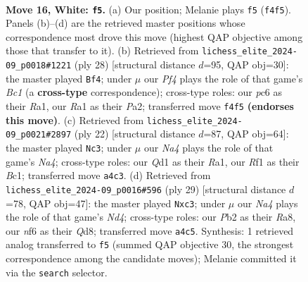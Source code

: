 \documentclass[11pt]{article}
\begin{document}
\begin{figure}[p]
\label{fig:thought-m28}
\end{figure}

\clearpage

\begin{figure}[p]\centering
\begin{subfigure}{0.46\textwidth}\centering
\resizebox{\linewidth}{!}{%
\newchessgame
\chessboard[
  setfen={r6r/p2nkppp/q1pbpn2/8/Np1P1PPN/4P3/PP5P/R1BQ1RK1 w - - 0 16},
  showmover=false,
  pgfstyle=straightmove, color=movearrow, markmove={f4-f5}
]}
\caption{}
\end{subfigure}\hfill
\begin{subfigure}{0.46\textwidth}\centering
\resizebox{\linewidth}{!}{%
\newchessgame
\chessboard[
  setfen={r4rk1/p1q1bppp/b1p2n2/2p2P2/1pN1P3/3P4/PPP1N1PP/R1BQ1RK1 w - - 6 15},
  showmover=false,
  pgfstyle=straightmove, color=movearrow, markmove={c1-f4}
]}
\caption{}
\end{subfigure}
\\[4pt]
\begin{subfigure}{0.46\textwidth}\centering
\resizebox{\linewidth}{!}{%
\newchessgame
\chessboard[
  setfen={rn3rk1/pp2ppbp/2pp1np1/8/N1qPP3/5BPP/PP3P2/R1BQ1RK1 w - - 0 12},
  showmover=false,
  pgfstyle=straightmove, color=movearrow, markmove={a4-c3}
]}
\caption{}
\end{subfigure}\hfill
\begin{subfigure}{0.46\textwidth}\centering
\resizebox{\linewidth}{!}{%
\newchessgame
\chessboard[
  setfen={r2q1r1k/1pp3pp/p1n1b3/2Pnpp2/8/PQNP1NP1/4PPBP/2R2RK1 b - - 2 15},
  showmover=false,
  pgfstyle=straightmove, color=movearrow, markmove={d5-c3}
]}
\caption{}
\end{subfigure}
\caption{\textbf{Move 16, White: \texttt{f5}.} (a) Our position; Melanie plays \texttt{f5} (\texttt{f4f5}). Panels (b)--(d) are the retrieved master positions whose correspondence most drove this move (highest QAP objective among those that transfer to it). (b) Retrieved from \texttt{lichess\_elite\_2024-09\_p0018\#1221} (ply 28) [structural distance $d$=95, QAP obj=30]: the master played \texttt{Bf4}; under $\mu$ our \emph{Pf4} plays the role of that game's \emph{Bc1} (a \textbf{cross-type} correspondence); cross-type roles: our \emph{p}c6 as their \emph{R}a1, our \emph{R}a1 as their \emph{P}a2; transferred move \texttt{f4f5} \textbf{(endorses this move)}. (c) Retrieved from \texttt{lichess\_elite\_2024-09\_p0021\#2897} (ply 22) [structural distance $d$=87, QAP obj=64]: the master played \texttt{Nc3}; under $\mu$ our \emph{Na4} plays the role of that game's \emph{Na4}; cross-type roles: our \emph{Q}d1 as their \emph{R}a1, our \emph{R}f1 as their \emph{B}c1; transferred move \texttt{a4c3}. (d) Retrieved from \texttt{lichess\_elite\_2024-09\_p0016\#596} (ply 29) [structural distance $d$=78, QAP obj=47]: the master played \texttt{Nxc3}; under $\mu$ our \emph{Na4} plays the role of that game's \emph{Nd4}; cross-type roles: our \emph{P}b2 as their \emph{R}a8, our \emph{n}f6 as their \emph{Q}d8; transferred move \texttt{a4c5}. Synthesis: 1 retrieved analog transferred to \texttt{f5} (summed QAP objective 30, the strongest correspondence among the candidate moves); Melanie committed it via the \texttt{search} selector.}

\end{figure}
\end{document}
